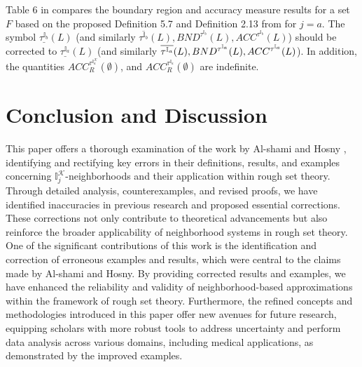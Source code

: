 \documentclass{article}
\theoremstyle{theorem}
\theoremstyle{definition}
\theoremstyle{remark}
\begin{document}
Table 6 in \cite{Al-shami 2024} compares the boundary region and accuracy measure results for a set $F$ based on the proposed Definition 5.7 and Definition 2.13 from \cite{Al-shami 2021} for $j = a$. The symbol $\underline{\tau^{\mathbb{I}_{b}}}(L)$ (and similarly $\overline{\tau^{\mathbb{I}_{b}}}(L), BND^{\tau^{\mathbb{I}_{b}}}(L), ACC^{\tau^{\mathbb{I}_{b}}}(L)$) should be corrected to $\underline{\tau^{\mathbb{I}_{a}}}(L)$ (and similarly $\overline{\tau^{\mathbb{I}_{a}}}(L), BND^{\tau^{\mathbb{I}_{a}}}(L), \\
ACC^{\tau^{\mathbb{I}_{a}}}(L)$). In addition, the quantities $ACC_{R}^{\tau^{\mathbb{I}^{\mathcal{K}}_{a}}}(\emptyset)$, and $ACC_{R}^{\tau^{\mathbb{I}_{a}}}(\emptyset)$ are indefinite. \color{black}\\

\section{Conclusion and Discussion}

This paper offers a thorough examination of the work by Al-shami and Hosny \cite{Al-shami 2024}, identifying and rectifying key errors in their definitions, results, and examples concerning $\mathbb{I}^{\mathcal{K}}_{j}$-neighborhoods and their application within rough set theory. Through detailed analysis, counterexamples, and revised proofs, we have identified inaccuracies in previous research and proposed essential corrections.
These corrections not only contribute to theoretical advancements but also reinforce the broader applicability of neighborhood systems in rough set theory. One of the significant contributions of this work is the identification and correction of erroneous examples and results, which were central to the claims made by Al-shami and Hosny. By providing corrected results and examples, we have enhanced the reliability and validity of neighborhood-based approximations within the framework of rough set theory. Furthermore, the refined concepts and methodologies introduced in this paper offer new avenues for future research, equipping scholars with more robust tools to address uncertainty and perform data analysis across various domains, including medical applications, as demonstrated by the improved examples. \\
\end{document}
